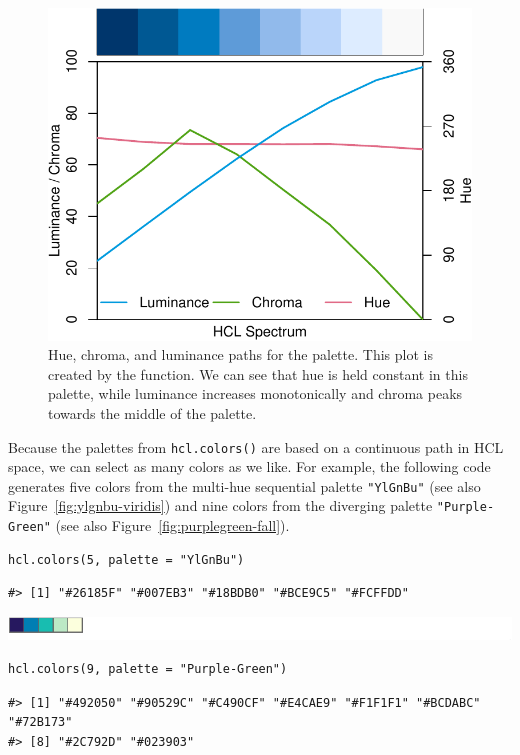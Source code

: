\begin{figure}[ht!]

{\centering \includegraphics[width=0.49\linewidth]{color_files/figure-latex/blues3hcl-1} 

}

\caption{Hue, chroma, and luminance paths for the  palette. This plot is created by the  function.  We can see that hue is held constant in this palette, while luminance increases monotonically and chroma peaks towards the middle of the palette.}\label{fig:blues3hcl}
\end{figure}

Because the palettes from \texttt{hcl.colors()} are based on a continuous
path in HCL space, we can select as many colors as we like.
For example,
the following code generates five colors from the multi-hue sequential
palette \texttt{"YlGnBu"} (see also Figure~\ref{fig:ylgnbu-viridis})
and nine colors from the diverging palette \texttt{"Purple-Green"}
(see also Figure~\ref{fig:purplegreen-fall}).

\begin{verbatim}
hcl.colors(5, palette = "YlGnBu")
\end{verbatim}

\begin{verbatim}
#> [1] "#26185F" "#007EB3" "#18BDB0" "#BCE9C5" "#FCFFDD"
\end{verbatim}

\includegraphics[width=1\linewidth]{color_files/figure-latex/YlGnBu-1}

\begin{verbatim}
hcl.colors(9, palette = "Purple-Green")
\end{verbatim}

\begin{verbatim}
#> [1] "#492050" "#90529C" "#C490CF" "#E4CAE9" "#F1F1F1" "#BCDABC" "#72B173"
#> [8] "#2C792D" "#023903"
\end{verbatim}

